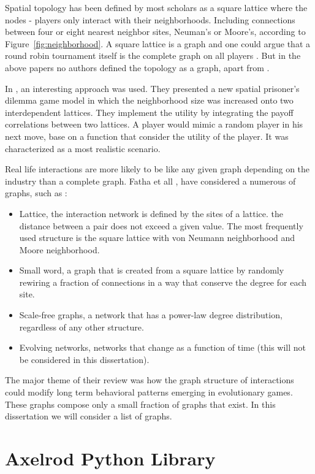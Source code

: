 Spatial topology has been defined by most scholars as a square lattice where
the nodes - players only interact with their neighborhoods. Including connections
between four or eight nearest neighbor sites, Neuman's or Moore's, according to
Figure~\ref{fig:neighborhood}. A square lattice is a graph and one could argue
that a round robin tournament itself is the complete graph on all players
\cite{Bela}. But in the above papers
no authors defined the topology as a graph, apart from \cite{Meng2015}.

In \cite{Meng2015}, an interesting approach was used. They presented a new
spatial prisoner's dilemma game model in which the neighborhood size was
increased onto two interdependent lattices. They implement the utility by
integrating the payoff correlations between two lattices. A player would mimic a
random player in his next move, base on a function that consider the utility of
the player. It was characterized as a most realistic scenario.

Real life interactions are more likely to be like any given graph depending on
the industry than a complete graph. Fatha et all \cite{Szabo2007}, have
considered a numerous of graphs, such as :

\begin{itemize}
  \item Lattice, the interaction network is defined by the sites of a lattice.
   the distance between a pair does not exceed a given value.
   The most frequently used structure is the square lattice with von Neumann
   neighborhood and Moore neighborhood.
  \item Small word, a graph that is created from a square lattice by randomly
   rewiring a fraction of connections in a way that conserve the degree for
   each site.
  \item Scale-free graphs, a network that has a power-law degree distribution, regardless of
   any other structure.
  \item Evolving networks, networks that change as a function of time (this will
      not be considered in this dissertation).
\end{itemize}

The major theme of their review was how the graph structure of interactions could
modify long term behavioral patterns emerging in evolutionary games.
These graphs compose only a small fraction of graphs that exist. In this
dissertation we will consider a list of graphs.

\section{Axelrod Python Library}

